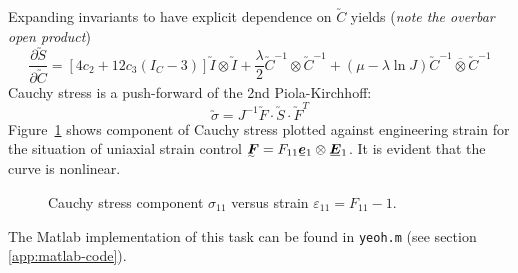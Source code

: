 Expanding invariants to have explicit dependence on \(\utilde{C}\) yields
(\textit{note the overbar open product})
\begin{equation}
  \label{eq:dSdC}
  \frac{\partial \utilde{S}}{\partial \utilde{C}} = 
  \left[ 4c_{2} + 12c_{3}\left( I_{C} - 3 \right) \right] 
      \utilde{I} \otimes \utilde{I} + 
      \frac{\lambda}{2} \utilde{C}^{-1} \otimes \utilde{C}^{-1} +
      \left( \mu - \lambda \ln{J} \right) \utilde{C}^{-1} \overline{\otimes}
      \utilde{C}^{-1}
\end{equation}
Cauchy stress is a push-forward of the 2nd Piola-Kirchhoff:
\begin{equation} \tag{5.45b}
  \label{eq:cauchy-push}
  \utilde{\sigma} = J^{-1} \utilde{F} \cdot \utilde{S} \cdot \utilde{F}^{T}
\end{equation}
Figure~\ref{fig:sigma-eps} shows component of Cauchy stress plotted against
engineering strain for the situation of uniaxial strain control
\(\utilde{F} = F_{11} \ubar{\bm{e}}_{1} \otimes \ubar{\bm{E}}_{1}\).
It is evident that the curve is nonlinear.
\begin{figure}[th]
  \centering
  \caption{Cauchy stress component \(\sigma_{11}\) versus strain
    \(\varepsilon_{11} = F_{11} - 1\).}
  \label{fig:sigma-eps}
\end{figure}

The Matlab implementation of this task can be found in \texttt{yeoh.m}
(see section \ref{app:matlab-code}).

